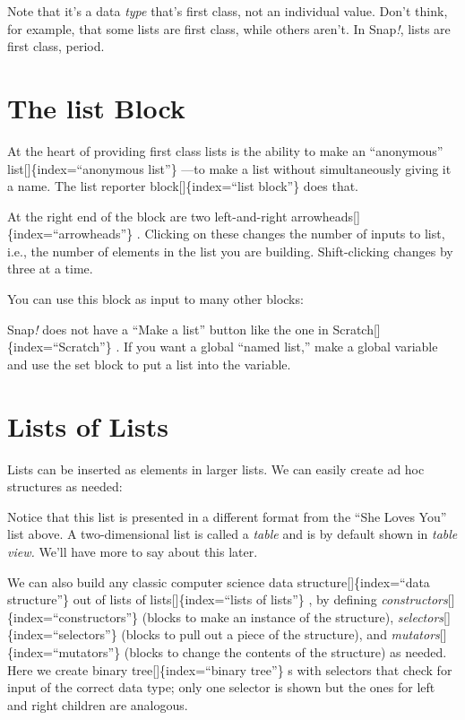 \documentclass[
  letterpaper,
]{book}
\begin{document}
Note that it's a data \emph{type} that's ﬁrst class, not an individual
value. Don't think, for example, that some lists are ﬁrst class, while
others aren't. In Snap\emph{!}, lists are ﬁrst class, period.

\section{The list Block}\label{the-list-block}

At the heart of providing first class lists is the ability to make an
``anonymous'' list{[}{]}\{index=``anonymous list''\} ---to make a list
without simultaneously giving it a name. The list reporter
block{[}{]}\{index=``list block''\} does that.

At the right end of the block are two left-and-right
arrowheads{[}{]}\{index=``arrowheads''\} . Clicking on these changes the
number of inputs to list, i.e., the number of elements in the list you
are building. Shift-clicking changes by three at a time.

You can use this block as input to many other blocks:

Snap\emph{!} does not have a ``Make a list'' button like the one in
Scratch{[}{]}\{index=``Scratch''\} . If you want a global ``named
list,'' make a global variable and use the set block to put a list into
the variable.

\section{Lists of Lists}\label{lists-of-lists}

Lists can be inserted as elements in larger lists. We can easily create
ad hoc structures as needed:

Notice that this list is presented in a different format from the ``She
Loves You'' list above. A two-dimensional list is called a \emph{table}
and is by default shown in \emph{table view.} We'll have more to say
about this later.

We can also build any classic computer science data
structure{[}{]}\{index=``data structure''\} out of lists of
lists{[}{]}\{index=``lists of lists''\} , by defining
\emph{constructors}{[}{]}\{index=``constructors''\} (blocks to make an
instance of the structure),
\emph{selectors}{[}{]}\{index=``selectors''\} (blocks to pull out a
piece of the structure), and \emph{mutators}{[}{]}\{index=``mutators''\}
(blocks to change the contents of the structure) as needed. Here we
create binary tree{[}{]}\{index=``binary tree''\} s with selectors that
check for input of the correct data type; only one selector is shown but
the ones for left and right children are analogous.
\end{document}
